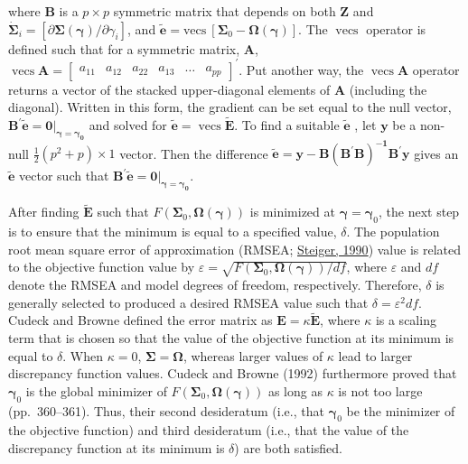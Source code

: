 \documentclass[11pt]{umnthesis}
\DeclareMathOperator{\vecs}{vecs}
\begin{document}
\noindent where \(\mathbf{B}\) is a \(p \times p\) symmetric matrix that depends on both \(\mathbf{Z}\) and \(\dot{\bm{\Sigma}}_i = [\partial \bm{\Sigma}(\bm{\gamma})/ \partial \gamma_i]\), and \(\tilde{\mathbf{e}} = \textrm{vecs} \: [ \bm{\Sigma}_0 - \bm{\Omega}(\bm{\gamma}) ]\). The \(\vecs\) operator is defined such that for a symmetric matrix, \(\mathbf{A}\), \(\vecs \mathbf{A} = \begin{bmatrix} a_{11} & a_{12} & a_{22} & a_{13} & \dots & a_{pp} \end{bmatrix}^\prime\). Put another way, the \(\vecs \mathbf{A}\) operator returns a vector of the stacked upper-diagonal elements of \(\mathbf{A}\) (including the diagonal). Written in this form, the gradient can be set equal to the null vector, \(\mathbf{B}^\prime \mathbf{\tilde{e}} = \bm{0} |_{\bm{\gamma = \bm{\gamma}_0}}\) and solved for \(\tilde{\mathbf{e}} = \vecs \tilde{\mathbf{E}}\). To find a suitable \(\mathbf{\tilde{e}}\) , let \(\mathbf{y}\) be a non-null \(\frac{1}{2}(p^2 + p) \times 1\) vector. Then the difference \(\mathbf{\tilde{e}} = \mathbf{y} - \mathbf{B(\mathbf{B}^\prime \mathbf{B})^{-1} \mathbf{B}^\prime \mathbf{y}}\) gives an \(\mathbf{\tilde{e}}\) vector such that \(\mathbf{B}^\prime \mathbf{\tilde{e}} = \bm{0} |_{\bm{\gamma = \bm{\gamma}_0}}\).

After finding \(\tilde{\mathbf{E}}\) such that \(F(\bm{\Sigma}_0, \bm{\Omega}(\bm{\gamma}))\) is minimized at \(\bm{\gamma} = \bm{\gamma}_0\), the next step is to ensure that the minimum is equal to a specified value, \(\delta\). The population root mean square error of approximation (RMSEA; \protect\hyperlink{ref-steiger1990}{Steiger, 1990}) value is related to the objective function value by \(\varepsilon = \sqrt{F(\bm{\Sigma}_0, \bm{\Omega}(\bm{\gamma}))/df}\), where \(\varepsilon\) and \(df\) denote the RMSEA and model degrees of freedom, respectively. Therefore, \(\delta\) is generally selected to produced a desired RMSEA value such that \(\delta = \varepsilon^2 df\). Cudeck and Browne defined the error matrix as \(\mathbf{E} = \kappa \tilde{\mathbf{E}}\), where \(\kappa\) is a scaling term that is chosen so that the value of the objective function at its minimum is equal to \(\delta\). When \(\kappa = 0\), \(\bm{\Sigma} = \bm{\Omega}\), whereas larger values of \(\kappa\) lead to larger discrepancy function values. Cudeck and Browne (1992) furthermore proved that \(\bm{\gamma}_0\) is the global minimizer of \(F(\bm{\Sigma}_0, \bm{\Omega}(\bm{\gamma}))\) as long as \(\kappa\) is not too large (pp.~360--361). Thus, their second desideratum (i.e., that \(\bm{\gamma}_0\) be the minimizer of the objective function) and third desideratum (i.e., that the value of the discrepancy function at its minimum is \(\delta\)) are both satisfied.
\end{document}
